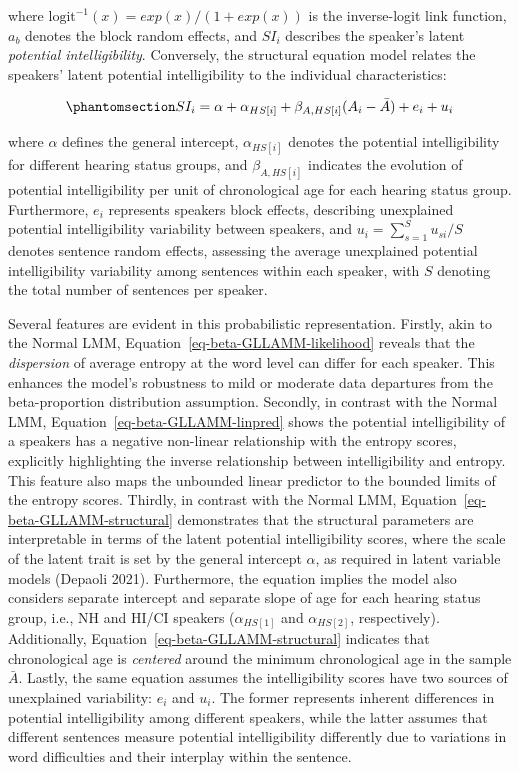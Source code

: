 \documentclass[
sn-apacite
]{sn-jnl}
\begin{document}
where \(\text{logit}^{-1}(x) = exp(x) / (1+exp(x))\) is the
inverse-logit link function, \(a_{b}\) denotes the block random effects,
and \(SI_{i}\) describes the speaker's latent \emph{potential
intelligibility}. Conversely, the structural equation model relates the
speakers' latent potential intelligibility to the individual
characteristics:

\begin{equation}\phantomsection\label{eq-beta-GLLAMM-structural}{
SI_{i} = \alpha + \alpha_{HS[i]} + \beta_{A, HS[i]} (A_{i} - \bar{A}) + e_{i} + u_{i}
}\end{equation}

where \(\alpha\) defines the general intercept, \(\alpha_{HS[i]}\)
denotes the potential intelligibility for different hearing status
groups, and \(\beta_{A,HS[i]}\) indicates the evolution of potential
intelligibility per unit of chronological age for each hearing status
group. Furthermore, \(e_{i}\) represents speakers block effects,
describing unexplained potential intelligibility variability between
speakers, and \(u_{i} = \sum_{s=1}^{S} u_{si}/S\) denotes sentence
random effects, assessing the average unexplained potential
intelligibility variability among sentences within each speaker, with
\(S\) denoting the total number of sentences per speaker.

Several features are evident in this probabilistic representation.
Firstly, akin to the Normal LMM,
Equation~\ref{eq-beta-GLLAMM-likelihood} reveals that the
\emph{dispersion} of average entropy at the word level can differ for
each speaker. This enhances the model's robustness to mild or moderate
data departures from the beta-proportion distribution assumption.
Secondly, in contrast with the Normal LMM,
Equation~\ref{eq-beta-GLLAMM-linpred} shows the potential
intelligibility of a speakers has a negative non-linear relationship
with the entropy scores, explicitly highlighting the inverse
relationship between intelligibility and entropy. This feature also maps
the unbounded linear predictor to the bounded limits of the entropy
scores. Thirdly, in contrast with the Normal LMM,
Equation~\ref{eq-beta-GLLAMM-structural} demonstrates that the
structural parameters are interpretable in terms of the latent potential
intelligibility scores, where the scale of the latent trait is set by
the general intercept \(\alpha\), as required in latent variable models
(Depaoli 2021). Furthermore, the equation implies the model also
considers separate intercept and separate slope of age for each hearing
status group, i.e., NH and HI/CI speakers (\(\alpha_{HS[1]}\) and
\(\alpha_{HS[2]}\), respectively). Additionally,
Equation~\ref{eq-beta-GLLAMM-structural} indicates that chronological
age is \emph{centered} around the minimum chronological age in the
sample \(\bar{A}\). Lastly, the same equation assumes the
intelligibility scores have two sources of unexplained variability:
\(e_{i}\) and \(u_{i}\). The former represents inherent differences in
potential intelligibility among different speakers, while the latter
assumes that different sentences measure potential intelligibility
differently due to variations in word difficulties and their interplay
within the sentence.
\end{document}
